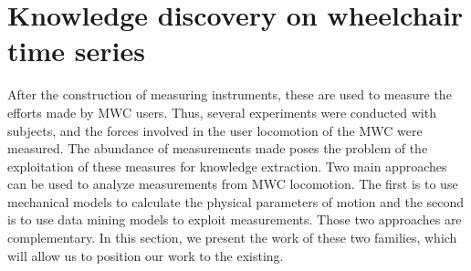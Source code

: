 \section[Wheelchair time series]{Knowledge discovery on wheelchair time series}
After the construction of measuring instruments, these are used to measure the efforts made by MWC users. Thus, several experiments were conducted with subjects, and the forces involved in the user locomotion of the MWC were measured. The abundance of measurements made poses the problem of the exploitation of these measures for knowledge extraction. Two main approaches can be used to analyze measurements from MWC locomotion. The first is to use mechanical models to calculate the physical parameters of motion and the second is to use data mining models to exploit measurements. Those two approaches are complementary. In this section, we present the work of these two families, which will allow us to position our work to the existing.



